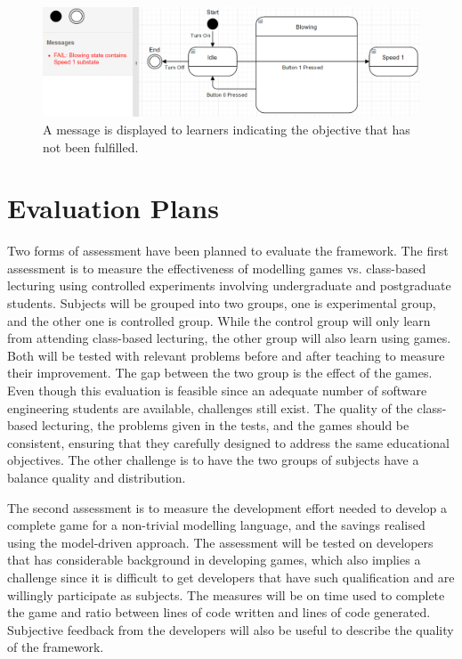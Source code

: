 \documentclass[conference]{IEEEtran}
\begin{document}
\begin{figure}[!t]
\centering
\includegraphics[width=\linewidth]{example-fail-messages}
\caption{A message is displayed to learners indicating the objective that has not been fulfilled.}
\label{example-fail-messages}
\end{figure}  

\section{Evaluation Plans}
\label{Evaluation Plans}
Two forms of assessment have been planned to evaluate the framework. The first assessment is to measure the effectiveness of modelling games vs. class-based lecturing using controlled experiments involving undergraduate and postgraduate students. Subjects will be grouped into two groups, one is experimental group, and the other one is controlled group. While the control group will only learn from attending class-based lecturing, the other group will also learn using games. Both will be tested with relevant problems before and after teaching to measure their improvement. The gap between the two group is the effect of the games. Even though this evaluation is feasible since an adequate number of software engineering students are available, challenges still exist. The quality of the class-based lecturing, the problems given in the tests, and the games should be consistent, ensuring that they carefully designed to address the same educational objectives. The other challenge is to have the two groups of subjects have a balance quality and distribution. 
  
The second assessment is to measure the development effort needed to develop a complete game for a non-trivial modelling language, and the savings realised using the model-driven approach. The assessment will be tested on developers that has considerable background in developing games, which also implies a challenge since it is difficult to get developers that have such qualification and are willingly participate as subjects. The measures will be on time used to complete the game and ratio between lines of code written and lines of code generated. Subjective feedback from the developers will also be useful to describe the quality of the framework.  
  
\end{document}
